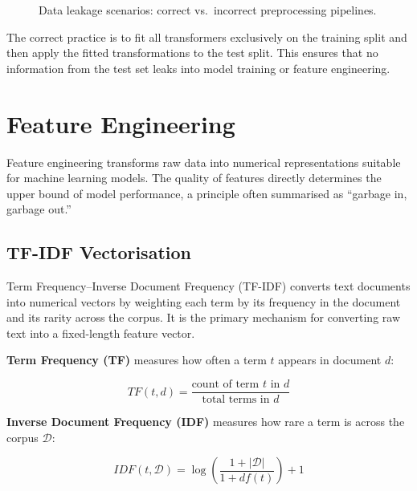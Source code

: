 \documentclass[10pt,a4paper]{article}
\begin{document}
\begin{figure}[H]
    \centering
    \caption{Data leakage scenarios: correct vs.\ incorrect preprocessing pipelines.}
    \label{fig:data-leakage-scenarios}
\end{figure}

The correct practice is to fit all transformers exclusively on the training split and then apply the fitted transformations to the test split. This ensures that no information from the test set leaks into model training or feature engineering.

\section{Feature Engineering}
\label{sec:feature-engineering}

Feature engineering transforms raw data into numerical representations suitable for machine learning models. The quality of features directly determines the upper bound of model performance, a principle often summarised as ``garbage in, garbage out.''

\subsection{TF-IDF Vectorisation}
\label{sec:tfidf}

Term Frequency--Inverse Document Frequency (TF-IDF) converts text documents into numerical vectors by weighting each term by its frequency in the document and its rarity across the corpus. It is the primary mechanism for converting raw text into a fixed-length feature vector.

\textbf{Term Frequency (TF)} measures how often a term $t$ appears in document $d$:

\begin{equation}
TF(t, d) = \frac{\text{count of term } t \text{ in } d}{\text{total terms in } d}
\label{eq:tf}
\end{equation}

\textbf{Inverse Document Frequency (IDF)} measures how rare a term is across the corpus $\mathcal{D}$:

\begin{equation}
IDF(t, \mathcal{D}) = \log\left(\frac{1 + |\mathcal{D}|}{1 + df(t)}\right) + 1
\label{eq:idf}
\end{equation}
\end{document}
